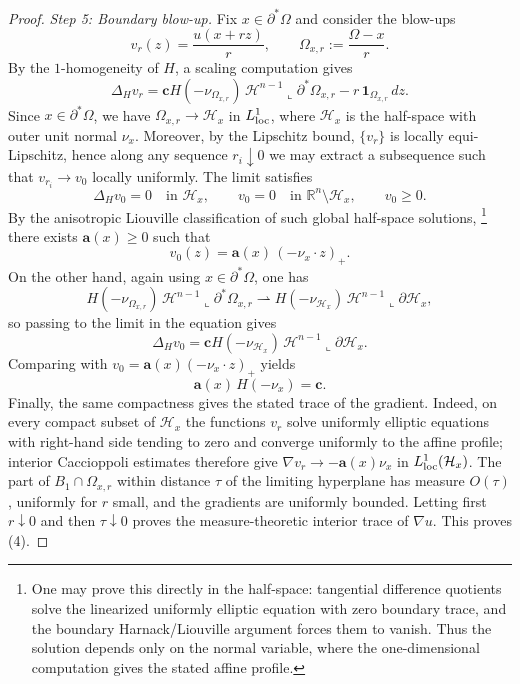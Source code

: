 \documentclass[reqno,11pt]{amsart}
\numberwithin{equation}{section}
\theoremstyle{remark}
\begin{document}
\begin{proof}
\medskip
\noindent\textit{Step 5: Boundary blow-up.}
Fix $x\in \partial^*\Omega$ and consider the blow-ups
\[
v_r(z)=\frac{u(x+rz)}{r},\qquad \Omega_{x,r}:=\frac{\Omega-x}{r}.
\]
By the $1$-homogeneity of $H$, a scaling computation gives
\[
\Delta_H v_r=\mathbf{c}H(-\nu_{\Omega_{x,r}})\,\mathscr{H}^{n-1}\llcorner \partial^* \Omega_{x,r}
- r\,\mathbf{1}_{\Omega_{x,r}}\,dz.
\]
Since $x\in\partial^*\Omega$, we have $\Omega_{x,r}\to \mathcal H_x$ in $L^1_{\rm loc}$, where $\mathcal H_x$ is the half-space
with outer unit normal $\nu_x$. Moreover, by the Lipschitz bound, $\{v_r\}$ is locally equi-Lipschitz, hence along any sequence
$r_i\downarrow 0$ we may extract a subsequence such that $v_{r_i}\to v_0$ locally uniformly. The limit satisfies
\[
\Delta_H v_0=0\quad \text{in }\mathcal H_x,\qquad v_0=0\quad \text{in }\mathbb R^n\setminus \mathcal H_x,\qquad v_0\ge 0.
\]
By the anisotropic Liouville classification of such global half-space solutions, \footnote{{One may prove this directly in the half-space: tangential difference quotients solve the linearized uniformly elliptic equation with zero boundary trace, and the boundary Harnack/Liouville argument forces them to vanish. Thus the solution depends only on the normal variable, where the one-dimensional computation gives the stated affine profile.}} there exists $\mathbf a(x)\ge 0$ such that
\[
v_0(z)=\mathbf a(x)\,(-\nu_x\cdot z)_+.
\]
On the other hand, again using $x\in\partial^*\Omega$, one has
\[
H(-\nu_{\Omega_{x,r}})\,\mathscr{H}^{n-1}\llcorner \partial^*\Omega_{x,r}
\rightharpoonup
H(-\nu_{\mathcal H_x})\,\mathscr{H}^{n-1}\llcorner \partial\mathcal H_x,
\]
so passing to the limit in the equation gives
\[
\Delta_H v_0=\mathbf{c}H(-\nu_{\mathcal H_x})\,\mathscr{H}^{n-1}\llcorner \partial\mathcal H_x.
\]
Comparing with $v_0=\mathbf a(x)(-\nu_x\cdot z)_+$ yields
\[
\mathbf a(x)\,H(-\nu_x)=\mathbf c.
\]
{Finally, the same compactness gives the stated trace of the gradient. Indeed, on every compact subset of
$\mathcal H_x$ the functions $v_r$ solve uniformly elliptic equations with right-hand side tending to zero and converge
uniformly to the affine profile; interior Caccioppoli estimates therefore give
$\nabla v_r\to -\mathbf a(x)\nu_x$ in $L^1_{\rm loc}(\mathcal H_x)$. The part of
$B_1\cap\Omega_{x,r}$ within distance $\tau$ of the limiting hyperplane has measure $O(\tau)$, uniformly for $r$ small,
and the gradients are uniformly bounded. Letting first $r\downarrow0$ and then $\tau\downarrow0$ proves the
measure-theoretic interior trace of $\nabla u$.}
This proves (4).


\end{proof}
\end{document}
